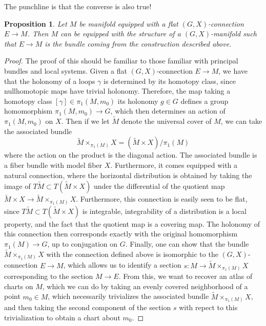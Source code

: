 \documentclass[psamsfonts, 12pt]{amsart}
\newtheorem{prop}[thm]{Proposition}
\theoremstyle{definition}
\theoremstyle{remark}
\begin{document}
%
The punchline is that the converse is also true!
%
\begin{prop}
Let $M$ be manifold equipped with a flat $(G,X)$-connection $E \to M$. Then
$M$ can be equipped with the structure of a $(G,X)$-manifold such that
$E \to M$ is the bundle coming from the construction described above.
\end{prop}
%
\begin{proof}
The proof of this should be familiar to those familiar with principal bundles
and local systems. Given a flat $(G,X)$-connection $E \to M$, we have that
the holonomy of a loops $\gamma$ is determined by its homotopy class, since
nullhomotopic maps have trivial holonomy. Therefore, the map taking
a homotopy class $[\gamma] \in \pi_1(M, m_0)$ its holonomy $g \in G$ defines
a group homomorphism $\pi_1(M,m_0) \to G$, which then determines
an action of $\pi_1(M,m_0)$ on $X$. Then if we let $\widetilde{M}$ denote
the universal cover of $M$, we can take the associated bundle
\[
\widetilde{M} \times_{\pi_1(M)} X = (\widetilde{M} \times X)/\pi_1(M)
\]
where the action on the product is the diagonal action. The associated
bundle is a fiber bundle with model fiber $X$. Furthermore, it comes equipped
with a natural connection, where the horizontal distribution is obtained
by taking the image of $T\widetilde{M} \subset T(\widetilde{M} \times X)$ under the
differential of the quotient map
$\widetilde{M}\times X \to \widetilde{M} \times_{\pi_1(M)} X$. Furthermore, this
connection is easily seen to be flat, since
$T\widetilde{M} \subset T(\widetilde{M} \times X)$ is integrable,
integrability of a distribution is a local property, and the fact that the quotient
map is a covering map. The holonomy of this connection then corresponds exactly with
the original homomorphism $\pi_1(M) \to G$, up to conjugation on $G$.
Finally, one can show that the bundle $\widetilde{M} \times_{\pi_1(M)} X$ with the
connection defined above is isomorphic to the $(G,X)$-connection $E \to M$,
which allows us to identify a section $s : M \to \widetilde{M} \times_{\pi_1(M)} X$
corresponding to the section $M \to E$. From this, we want to recover an atlas of
charts on $M$, which we can do by taking an evenly covered
neighborhood of a point $m_0 \in M$, which necessarily trivializes
the associated bundle $\widetilde{M} \times_{\pi_1(M)} X$, and then
taking the second component of the section $s$ with repect to this trivialization
to obtain a chart about $m_0$.
\end{proof}
%
\end{document}
